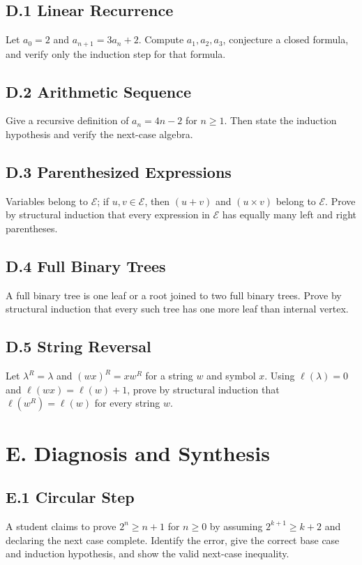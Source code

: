 \documentclass[11pt]{article}
\begin{document}
\subsection*{D.1 Linear Recurrence}
Let $a_0=2$ and $a_{n+1}=3a_n+2$. Compute $a_1,a_2,a_3$, conjecture a closed
formula, and verify only the induction step for that formula.

\subsection*{D.2 Arithmetic Sequence}
Give a recursive definition of $a_n=4n-2$ for $n\ge1$. Then state the
induction hypothesis and verify the next-case algebra.

\subsection*{D.3 Parenthesized Expressions}
Variables belong to $\mathcal E$; if $u,v\in\mathcal E$, then $(u+v)$ and
$(u\times v)$ belong to $\mathcal E$. Prove by structural induction that
every expression in $\mathcal E$ has equally many left and right parentheses.

\subsection*{D.4 Full Binary Trees}
A full binary tree is one leaf or a root joined to two full binary trees. Prove
by structural induction that every such tree has one more leaf than internal
vertex.

\subsection*{D.5 String Reversal}
Let $\lambda^R=\lambda$ and $(wx)^R=xw^R$ for a string $w$ and symbol $x$.
Using $\ell(\lambda)=0$ and $\ell(wx)=\ell(w)+1$, prove by structural
induction that $\ell(w^R)=\ell(w)$ for every string $w$.

\newpage
\section*{E. Diagnosis and Synthesis}

\subsection*{E.1 Circular Step}
A student claims to prove $2^n\ge n+1$ for $n\ge0$ by assuming
$2^{k+1}\ge k+2$ and declaring the next case complete. Identify the error,
give the correct base case and induction hypothesis, and show the valid
next-case inequality.
\end{document}
